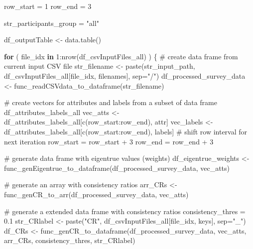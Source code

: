 \documentclass[
]{article}
\newenvironment{Shaded}{\begin{snugshade}}{\end{snugshade}}
\newcommand{\AttributeTok}[1]{\textcolor[rgb]{0.00,0.34,0.68}{#1}}
\newcommand{\CommentTok}[1]{\textcolor[rgb]{0.54,0.53,0.53}{#1}}
\newcommand{\ControlFlowTok}[1]{\textcolor[rgb]{0.12,0.11,0.11}{\textbf{#1}}}
\newcommand{\DecValTok}[1]{\textcolor[rgb]{0.69,0.50,0.00}{#1}}
\newcommand{\FloatTok}[1]{\textcolor[rgb]{0.69,0.50,0.00}{#1}}
\newcommand{\FunctionTok}[1]{\textcolor[rgb]{0.39,0.29,0.61}{#1}}
\newcommand{\NormalTok}[1]{\textcolor[rgb]{0.12,0.11,0.11}{#1}}
\newcommand{\OtherTok}[1]{\textcolor[rgb]{0.00,0.43,0.16}{#1}}
\newcommand{\SpecialCharTok}[1]{\textcolor[rgb]{0.24,0.68,0.91}{#1}}
\newcommand{\StringTok}[1]{\textcolor[rgb]{0.75,0.01,0.01}{#1}}
\begin{document}
\begin{Shaded}
\begin{Highlighting}[]
\NormalTok{row\_start }\OtherTok{=} \DecValTok{1}
\NormalTok{row\_end }\OtherTok{=} \DecValTok{3}

\NormalTok{str\_participants\_group }\OtherTok{=} \StringTok{"all"}

\NormalTok{df\_outputTable }\OtherTok{\textless{}{-}} \FunctionTok{data.table}\NormalTok{()}

\ControlFlowTok{for}\NormalTok{ ( file\_idx }\ControlFlowTok{in} \DecValTok{1}\SpecialCharTok{:}\FunctionTok{nrow}\NormalTok{(df\_csvInputFiles\_all) ) \{}
  \CommentTok{\# create data frame from current input CSV file}
\NormalTok{  str\_filename }\OtherTok{\textless{}{-}} \FunctionTok{paste}\NormalTok{(str\_input\_path, df\_csvInputFiles\_all[file\_idx, filenames], }\AttributeTok{sep=}\StringTok{"/"}\NormalTok{)}
\NormalTok{  df\_processed\_survey\_data }\OtherTok{\textless{}{-}} \FunctionTok{func\_readCSVdata\_to\_dataframe}\NormalTok{(str\_filename)}
  
  \CommentTok{\# create vectors for attributes and labels from a subset of data frame \textquotesingle{}df\_attributes\_labels\_all\textquotesingle{}}
\NormalTok{  vec\_atts }\OtherTok{\textless{}{-}}\NormalTok{ df\_attributes\_labels\_all[}\FunctionTok{c}\NormalTok{(row\_start}\SpecialCharTok{:}\NormalTok{row\_end), attr]}
\NormalTok{  vec\_labels }\OtherTok{\textless{}{-}}\NormalTok{ df\_attributes\_labels\_all[}\FunctionTok{c}\NormalTok{(row\_start}\SpecialCharTok{:}\NormalTok{row\_end), labels]}
  \CommentTok{\# shift row interval for next iteration}
\NormalTok{  row\_start }\OtherTok{=}\NormalTok{ row\_start }\SpecialCharTok{+} \DecValTok{3}
\NormalTok{  row\_end }\OtherTok{=}\NormalTok{ row\_end }\SpecialCharTok{+} \DecValTok{3}
  
  \CommentTok{\# generate data frame with eigentrue values (weights) }
\NormalTok{  df\_eigentrue\_weights }\OtherTok{\textless{}{-}} \FunctionTok{func\_genEigentrue\_to\_dataframe}\NormalTok{(df\_processed\_survey\_data, vec\_atts)}
  
  \CommentTok{\# generate an array with consistency ratios}
\NormalTok{  arr\_CRs }\OtherTok{\textless{}{-}} \FunctionTok{func\_genCR\_to\_arr}\NormalTok{(df\_processed\_survey\_data, vec\_atts)}

  \CommentTok{\# generate a extended data frame with consistency ratios}
\NormalTok{  consistency\_thres }\OtherTok{=} \FloatTok{0.1}
\NormalTok{  str\_CRlabel }\OtherTok{\textless{}{-}} \FunctionTok{paste}\NormalTok{(}\StringTok{"CR"}\NormalTok{, df\_csvInputFiles\_all[file\_idx, keys], }\AttributeTok{sep=}\StringTok{"\_"}\NormalTok{)}
\NormalTok{  df\_CRs }\OtherTok{\textless{}{-}} \FunctionTok{func\_genCR\_to\_dataframe}\NormalTok{(df\_processed\_survey\_data, vec\_atts, arr\_CRs, consistency\_thres, str\_CRlabel)}
  

\end{Highlighting}
\end{Shaded}
\end{document}
